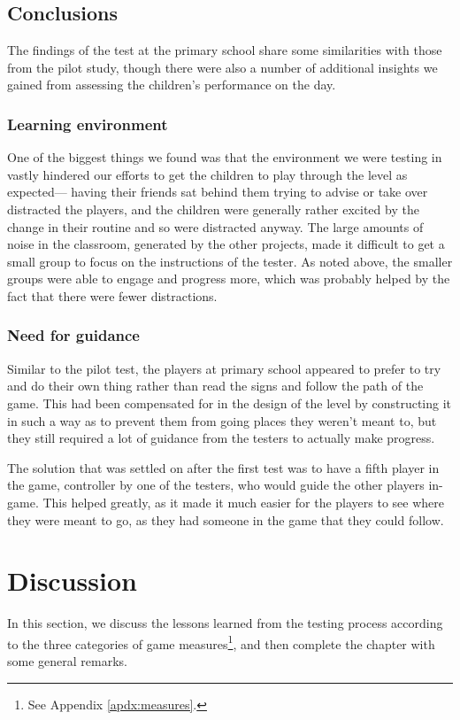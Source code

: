 \subsection{Conclusions}
The findings of the test at the primary school share some similarities with those
from the pilot study, though there were also a number of additional insights we
gained from assessing the children's performance on the day.

\subsubsection{Learning environment}
One of the biggest things we found was that the environment we were testing in
vastly hindered our efforts to get the children to play through the level as expected---
having their friends sat behind them trying to advise or take over distracted the
players, and the children were generally rather excited by the change in their
routine and so were distracted anyway. The large amounts of noise in the classroom,
generated by the other projects, made it difficult to get a small group to
focus on the instructions of the tester. As noted above, the smaller groups were
able to engage and progress more, which was probably helped by the fact that there
were fewer distractions.

\subsubsection{Need for guidance}
Similar to the pilot test, the players at primary school appeared to prefer to try
and do their own thing rather than read the signs and follow the path of the game.
This had been compensated for in the design of the level by constructing it in
such a way as to prevent them from going places they weren't meant to, but they
still required a lot of guidance from the testers to actually make progress.

The solution that was settled on after the first test was to have a fifth player
in the game, controller by one of the testers, who would guide the other players
in-game. This helped greatly, as it made it much easier for the players to
see where they were meant to go, as they had someone in the game that they could follow.


\section{Discussion}
In this section, we discuss the lessons learned from the testing process according
to the three categories of game measures\footnote{See Appendix \ref{apdx:measures}.},
and then complete the chapter with some general remarks.

